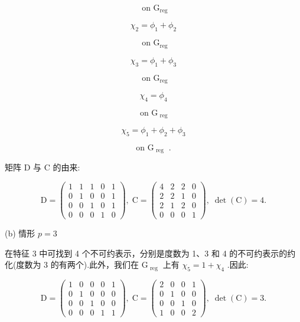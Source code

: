 \documentclass[10pt]{article}
\begin{document}
\[
\text{ on }{\mathrm{G}}_{\mathrm{{reg}}}
\]

\[
{\chi }_{2} = {\phi }_{1} + {\phi }_{2}
\]

\[
\text{ on }{\mathrm{G}}_{\mathrm{{reg}}}
\]

\[
{\chi }_{3} = {\phi }_{1} + {\phi }_{3}
\]

\[
\text{ on }{\mathrm{G}}_{\mathrm{{reg}}}
\]

\[
{\chi }_{4} = {\phi }_{4}
\]

\[
\text{ on }{\mathrm{G}}_{\text{ reg }}
\]

\[
{\chi }_{5} = {\phi }_{1} + {\phi }_{2} + {\phi }_{3}
\]

\[
\text{ on }{\mathrm{G}}_{\text{ reg }}\text{ . }
\]

矩阵 \(\mathrm{D}\) 与 \(\mathrm{C}\) 的由来:

\[
\mathrm{D} = \left( \begin{array}{lllll} 1 & 1 & 1 & 0 & 1 \\  0 & 1 & 0 & 0 & 1 \\  0 & 0 & 1 & 0 & 1 \\  0 & 0 & 0 & 1 & 0 \end{array}\right) ,\;\mathrm{C} = \left( \begin{array}{llll} 4 & 2 & 2 & 0 \\  2 & 2 & 1 & 0 \\  2 & 1 & 2 & 0 \\  0 & 0 & 0 & 1 \end{array}\right) ,\;\det \left( \mathrm{C}\right)  = 4.
\]

(b) 情形 \(p = 3\)

在特征 3 中可找到 4 个不可约表示，分别是度数为 1、3 和 4 的不可约表示的约化(度数为 3 的有两个).此外，我们在 \({\mathrm{G}}_{\text{ reg }}\) 上有 \({\chi }_{5} = 1 + {\chi }_{4}\) .因此:

\[
\mathrm{D} = \left( \begin{array}{lllll} 1 & 0 & 0 & 0 & 1 \\  0 & 1 & 0 & 0 & 0 \\  0 & 0 & 1 & 0 & 0 \\  0 & 0 & 0 & 1 & 1 \end{array}\right) ,\;\mathrm{C} = \left( \begin{array}{llll} 2 & 0 & 0 & 1 \\  0 & 1 & 0 & 0 \\  0 & 0 & 1 & 0 \\  1 & 0 & 0 & 2 \end{array}\right) ,\;\det \left( \mathrm{C}\right)  = 3.
\]
\end{document}
